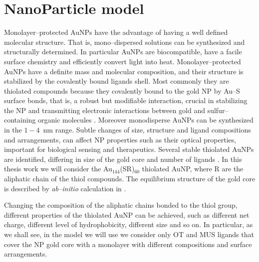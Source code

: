 \section{NanoParticle model}
Monolayer--protected \acp{AuNP} have the advantage of having a well defined molecular structure. That is, 
mono--dispersed solutions can be synthesized and structurally determined. In particular \acp{AuNP} are 
biocompatible, have a facile surface chemistry and efficiently convert light into heat. Monolayer--protected 
\acp{AuNP} have a definite mass and molecular composition, and their structure is stabilized by the covalently 
bound ligands shell. Most commonly they are thiolated compounds because they covalently bound to the gold \ac{NP} 
by Au--S surface bonds, that is, a robust but modifiable interaction, crucial in stabilizing the \ac{NP} and 
transmitting electronic interactions between gold and sulfur--containing organic molecules \cite{corePassivated}. 
Moreover monodisperse \acp{AuNP} can be synthesized in the $1-4$~nm range. Subtle changes of size, structure and 
ligand compositions and arrangements, can affect \ac{NP} properties such as their optical properties, important 
for biological sensing and therapeutics. 
Several stable thiolated \acp{AuNP} are identified, differing in size of the gold core and number of ligands 
\cite{corePassivated}. In this thesis work we will consider the {Au$_{144}$(SR)$_{60}$} thiolated \ac{AuNP}, where 
R are the aliphatic chain of the thiol compounds. The equilibrium structure of the gold core is described by 
\textit{ab--initio} calculation in \cite{clusterEquilibrium}. 

Changing the composition of the aliphatic chains bonded to the thiol group, different properties of the thiolated 
\ac{AuNP} can be achieved, such as different net charge, different level of hydrophobicity, different size and so 
on. In particular, as we shall see, in the model we will use we consider only \ac{OT} and \ac{MUS} ligands that 
cover the \ac{NP} gold core with a monolayer with different compositions and surface arrangements. 


